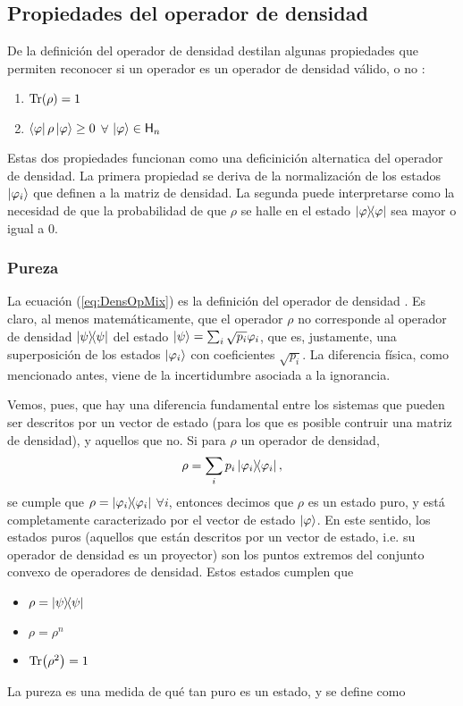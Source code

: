 \subsection{Propiedades del operador de densidad}
De la definición del operador de densidad destilan algunas propiedades que permiten reconocer si un operador es un operador de densidad válido, o no \cite{Holevo}:
\begin{enumerate}
    \item $\Tr(\rho)=1$
    \item $\bra{\varphi}\rho\ket{\varphi}\geq 0$ $\forall$ $\ket{\varphi}\in{\sf H}_{n}$
\end{enumerate}
Estas dos propiedades funcionan como una deficinición alternatica del operador de densidad. La primera propiedad se deriva de la normalización de los estados $\ket{\varphi_{i}}$ que definen a la matriz de densidad. La segunda puede interpretarse como la necesidad de que la probabilidad de que $\rho$ se halle en el estado $\dyad{\varphi}$ sea mayor o igual a $0$.
\subsubsection{Pureza}
La ecuación (\ref{eq:DensOpMix}) es la definición del operador de densidad \cite{Chuang}. Es claro, al menos matemáticamente, que el operador $\rho$ no corresponde al operador de densidad $\dyad{\psi}$ del estado $\ket{\psi}=\sum_{i}\sqrt{p_{i}}\varphi_{i}$, que es, justamente, una superposición de los estados $\ket{\varphi_{i}}$ con coeficientes $\sqrt{p_{i}}$.  La diferencia física, como mencionado antes, viene de la incertidumbre asociada a la ignorancia.


Vemos, pues, que hay una diferencia fundamental entre los sistemas que pueden ser descritos por un vector de estado (para los que es posible contruir una matriz de densidad), y aquellos que no. Si para $\rho$ un operador de densidad,
\begin{equation*}
    \rho=\sum_{i}p_{i}\dyad{\varphi_{i}},
\end{equation*}
se cumple que $\rho=\dyad{\varphi_{i}}$ $\forall i$, entonces decimos que $\rho$ es un estado puro, y está completamente caracterizado por el vector de estado $\ket{\varphi}$. En este sentido, los estados puros (aquellos que están descritos por un vector de estado, i.e. su operador de densidad es un proyector) son los puntos extremos del conjunto convexo de operadores de densidad. Estos estados cumplen que
\begin{itemize}
    \item $\rho=\dyad{\psi}$
    \item $\rho=\rho^{n}$
    \item $\Tr(\rho^{2})=1$
\end{itemize}
La pureza es una medida de qué tan puro es un estado, y se define como 
